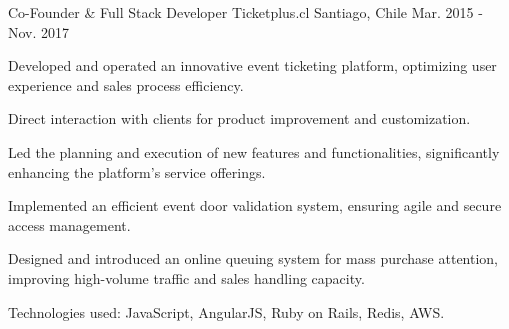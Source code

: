 \begin{cventries}
  \cventry
    {Co-Founder \& Full Stack Developer} %
    {Ticketplus.cl} %
    {Santiago, Chile} %
    {Mar. 2015 - Nov. 2017} %
    {
      \begin{cvitems} %
        \item {Developed and operated an innovative event ticketing platform, optimizing user experience and sales process efficiency.}
        \item {Direct interaction with clients for product improvement and customization.}
        \item {Led the planning and execution of new features and functionalities, significantly enhancing the platform's service offerings.}
        \item {Implemented an efficient event door validation system, ensuring agile and secure access management.}
        \item {Designed and introduced an online queuing system for mass purchase attention, improving high-volume traffic and sales handling capacity.}
        \item {Technologies used: JavaScript, AngularJS, Ruby on Rails, Redis, AWS.}
      \end{cvitems}
    }

\end{cventries}
